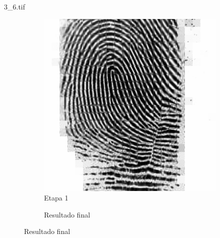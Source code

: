 \documentclass{beamer}
\begin{document}
\begin{frame}{3\_6.tif}
\begin{figure}
\begin{subfigure}[!ht]{0.32\textwidth}
                \includegraphics[width=\columnwidth]{Fingerprints/3_6_intermediate.jpg}
                \caption{Etapa 1}
            \end{subfigure}
            \begin{subfigure}[!ht]{0.32\textwidth}
                \caption{Resultado final}
            \end{subfigure}
        \end{figure}
    \end{frame}
\end{document}
